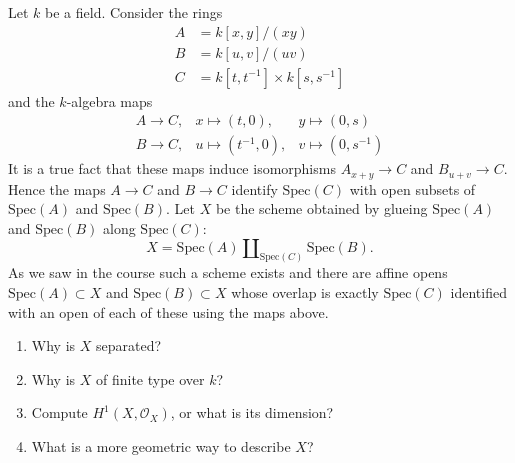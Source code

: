 \begin{exercise}
\label{exercise-glueing}
Let $k$ be a field.
Consider the rings
\begin{align*}
A & = k[x, y]/(xy) \\
B & = k[u, v]/(uv) \\
C & = k[t, t^{-1}] \times k[s, s^{-1}]
\end{align*}
and the $k$-algebra maps
$$
\begin{matrix}
A \longrightarrow C, &
x \mapsto (t, 0), &
y \mapsto (0, s) \\
B \longrightarrow C, &
u \mapsto (t^{-1}, 0), &
v \mapsto (0, s^{-1})
\end{matrix}
$$
It is a true fact that these maps induce isomorphisms
$A_{x + y} \to C$ and $B_{u + v} \to C$. Hence the maps $A \to C$
and $B \to C$ identify $\text{Spec}(C)$ with open subsets of
$\text{Spec}(A)$ and $\text{Spec}(B)$. Let $X$ be the scheme obtained
by glueing $\text{Spec}(A)$ and $\text{Spec}(B)$ along $\text{Spec}(C)$:
$$
X = \text{Spec}(A) \coprod\nolimits_{\text{Spec}(C)} \text{Spec}(B).
$$
As we saw in the course such a scheme exists and there are affine
opens $\text{Spec}(A) \subset X$ and $\text{Spec}(B) \subset X$
whose overlap is exactly $\text{Spec}(C)$ identified with an open of
each of these using the maps above.
\begin{enumerate}
\item Why is $X$ separated?
\item Why is $X$ of finite type over $k$?
\item Compute $H^1(X, \mathcal{O}_X)$, or what is its dimension?
\item What is a more geometric way to describe $X$?
\end{enumerate}
\end{exercise}



















